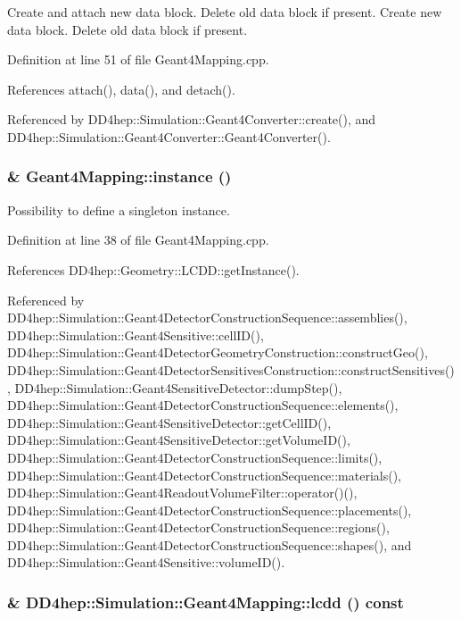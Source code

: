 Create and attach new data block. Delete old data block if present. Create new data block. Delete old data block if present. 

Definition at line 51 of file Geant4Mapping.cpp.

References attach(), data(), and detach().

Referenced by DD4hep::Simulation::Geant4Converter::create(), and DD4hep::Simulation::Geant4Converter::Geant4Converter().\hypertarget{class_d_d4hep_1_1_simulation_1_1_geant4_mapping_affbc609db47e67ea60b84e61a41c00b6}{
\subsubsection[{instance}]{ \& Geant4Mapping::instance ()}}
\label{class_d_d4hep_1_1_simulation_1_1_geant4_mapping_affbc609db47e67ea60b84e61a41c00b6}


Possibility to define a singleton instance. 

Definition at line 38 of file Geant4Mapping.cpp.

References DD4hep::Geometry::LCDD::getInstance().

Referenced by DD4hep::Simulation::Geant4DetectorConstructionSequence::assemblies(), DD4hep::Simulation::Geant4Sensitive::cellID(), DD4hep::Simulation::Geant4DetectorGeometryConstruction::constructGeo(), DD4hep::Simulation::Geant4DetectorSensitivesConstruction::constructSensitives(), DD4hep::Simulation::Geant4SensitiveDetector::dumpStep(), DD4hep::Simulation::Geant4DetectorConstructionSequence::elements(), DD4hep::Simulation::Geant4SensitiveDetector::getCellID(), DD4hep::Simulation::Geant4SensitiveDetector::getVolumeID(), DD4hep::Simulation::Geant4DetectorConstructionSequence::limits(), DD4hep::Simulation::Geant4DetectorConstructionSequence::materials(), DD4hep::Simulation::Geant4ReadoutVolumeFilter::operator()(), DD4hep::Simulation::Geant4DetectorConstructionSequence::placements(), DD4hep::Simulation::Geant4DetectorConstructionSequence::regions(), DD4hep::Simulation::Geant4DetectorConstructionSequence::shapes(), and DD4hep::Simulation::Geant4Sensitive::volumeID().\hypertarget{class_d_d4hep_1_1_simulation_1_1_geant4_mapping_a7c49db7ba62f718a331ea440f8087cf8}{
\subsubsection[{lcdd}]{\& DD4hep::Simulation::Geant4Mapping::lcdd () const}}
\label{class_d_d4hep_1_1_simulation_1_1_geant4_mapping_a7c49db7ba62f718a331ea440f8087cf8}


